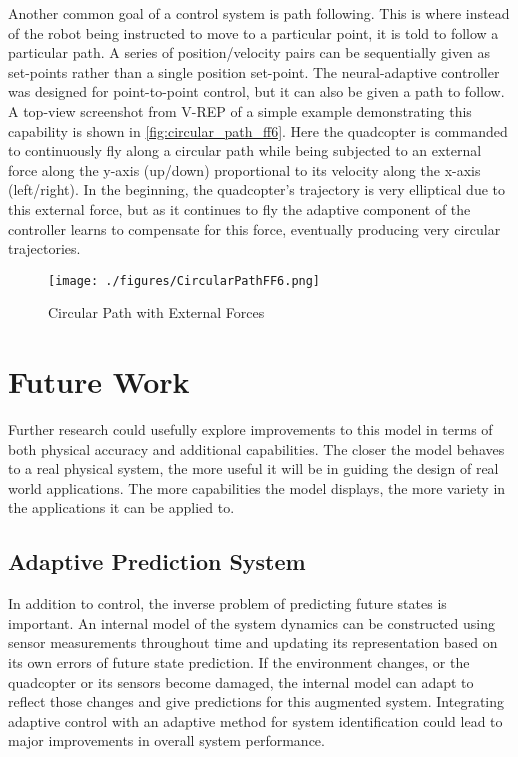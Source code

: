 \documentclass[letterpaper,12pt,titlepage,oneside,final]{book}
\begin{document}
Another common goal of a control system is path following.
This is where instead of the robot being instructed to move to a particular point, it is told to follow a particular path.
A series of position/velocity pairs can be sequentially given as set-points rather than a single position set-point.
The neural-adaptive controller was designed for point-to-point control, but it can also be given a path to follow.
A top-view screenshot from V-REP of a simple example demonstrating this capability is shown in \autoref{fig:circular_path_ff6}.
Here the quadcopter is commanded to continuously fly along a circular path while being subjected to an external force along the y-axis (up/down) proportional to its velocity along the x-axis (left/right).
In the beginning, the quadcopter's trajectory is very elliptical due to this external force, but as it continues to fly the adaptive component of the controller learns to compensate for this force, eventually producing very circular trajectories.


\begin{figure}
\centering
\texttt{[image: ./figures/CircularPathFF6.png]}
\caption{Circular Path with External Forces}
\label{fig:circular_path_ff6}
\end{figure}


\section{Future Work}

Further research could usefully explore improvements to this model in terms of both physical accuracy and additional capabilities.
The closer the model behaves to a real physical system, the more useful it will be in guiding the design of real world applications.
The more capabilities the model displays, the more variety in the applications it can be applied to.

\subsection{Adaptive Prediction System}

In addition to control, the inverse problem of predicting future states is important.
An internal model of the system dynamics can be constructed using sensor measurements throughout time and updating its representation based on its own errors of future state prediction.
If the environment changes, or the quadcopter or its sensors become damaged, the internal model can adapt to reflect those changes and give predictions for this augmented system.
Integrating adaptive control with an adaptive method for system identification could lead to major improvements in overall system performance.
\end{document}
